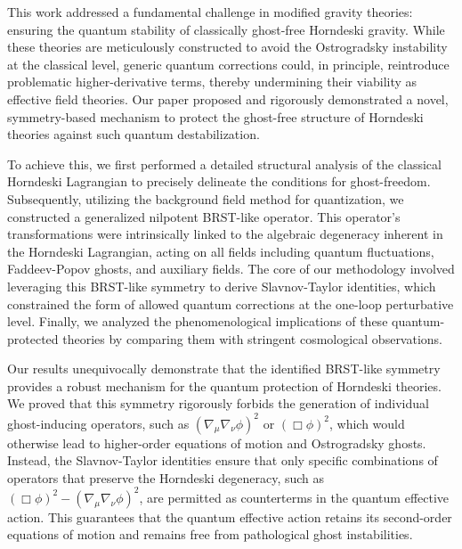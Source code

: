 \documentclass[twocolumn]{aastex631}
\begin{document}
This work addressed a fundamental challenge in modified gravity theories: ensuring the quantum stability of classically ghost-free Horndeski gravity. While these theories are meticulously constructed to avoid the Ostrogradsky instability at the classical level, generic quantum corrections could, in principle, reintroduce problematic higher-derivative terms, thereby undermining their viability as effective field theories. Our paper proposed and rigorously demonstrated a novel, symmetry-based mechanism to protect the ghost-free structure of Horndeski theories against such quantum destabilization.

To achieve this, we first performed a detailed structural analysis of the classical Horndeski Lagrangian to precisely delineate the conditions for ghost-freedom. Subsequently, utilizing the background field method for quantization, we constructed a generalized nilpotent BRST-like operator. This operator's transformations were intrinsically linked to the algebraic degeneracy inherent in the Horndeski Lagrangian, acting on all fields including quantum fluctuations, Faddeev-Popov ghosts, and auxiliary fields. The core of our methodology involved leveraging this BRST-like symmetry to derive Slavnov-Taylor identities, which constrained the form of allowed quantum corrections at the one-loop perturbative level. Finally, we analyzed the phenomenological implications of these quantum-protected theories by comparing them with stringent cosmological observations.

Our results unequivocally demonstrate that the identified BRST-like symmetry provides a robust mechanism for the quantum protection of Horndeski theories. We proved that this symmetry rigorously forbids the generation of individual ghost-inducing operators, such as $ (\nabla_\mu\nabla_\nu\phi)^2 $ or $ (\Box\phi)^2 $, which would otherwise lead to higher-order equations of motion and Ostrogradsky ghosts. Instead, the Slavnov-Taylor identities ensure that only specific combinations of operators that preserve the Horndeski degeneracy, such as $ (\Box\phi)^2 - (\nabla_\mu\nabla_\nu\phi)^2 $, are permitted as counterterms in the quantum effective action. This guarantees that the quantum effective action retains its second-order equations of motion and remains free from pathological ghost instabilities.
\end{document}
